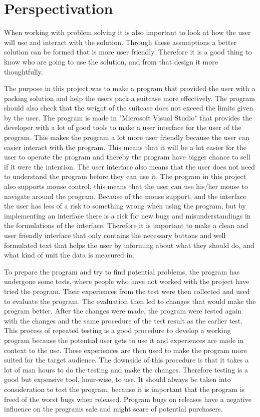 \section{Perspectivation}
When working with problem solving it is also important to look at how the user will use and interact with the solution. Through these assumptions a better solution can be formed that is more user friendly. Therefore it is a good thing to know who are going to use the solution, and from that design it more thoughtfully.

The purpose in this project was to make a program that provided the user with a packing solution and help the users pack a suitcase more effectively. The program should also check that the weight of the suitcase does not exceed the limits given by the user. The program is made in "Microsoft Visual Studio" that provides the developer with a lot of good tools to make a user interface for the user of the program.
This makes the program a lot more user friendly because the user can easier interact with the program. This means that it will be a lot easier for the user to operate the program and thereby the program have bigger chance to sell if it were the intention.
The user interface also means that the user does not need to understand the program before they can use it.
The program in this project also supports mouse control, this means that the user can use his/her mouse to navigate around the program. Because of the mouse support, and the interface the user has less of a risk to something wrong when using the program, but by implementing an interface there is a risk for new bugs and misunderstandings in the formulations of the interface.
Therefore it is important to make a clean and user friendly interface that only contains the necessary buttons and well formulated text that helps the user by informing about what they should do, and what kind of unit the data is measured in.

To prepare the program and try to find potential problems, the program has undergone some tests, where people who have not worked with the project have tried the program. Their experiences from the test were then collected and used to evaluate the program. The evaluation then led to changes that would make the program better. After the changes were made, the program were tested again with the changes and the same procedure of the test result as the earlier test.
This process of repeated testing is a good procedure to develop a working program because the potential user gets to use it and experiences are made in context to the use. These experiences are then used to make the program more suited for the target audience. The downside of this procedure is that it takes a lot of man hours to do the testing and make the changes. Therefore testing is a good but expensive tool, hour-wise, to use.
It should always be taken into consideration to test the program, because it is important that the program is freed of the worst bugs when released. Program bugs on releases have a negative influence on the programs sale and might scare of potential purchasers.


